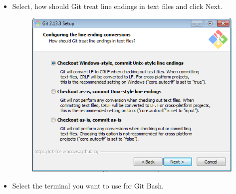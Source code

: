 \documentclass[11pt]{article} %
\begin{document}
\begin{itemize}
      	\pagebreak
      	\item Select, how should Git treat line endings in text files and click Next. 
      		\begin{figure}[h!]
      			\centering
      			\includegraphics[width=0.7\linewidth]{figs/GitBash7}
      			\caption{}
      			\label{fig:gitbash7}
      		\end{figure}
      	\item Select the terminal you want to use for Git Bash. 
      

\end{itemize}
\end{document}
